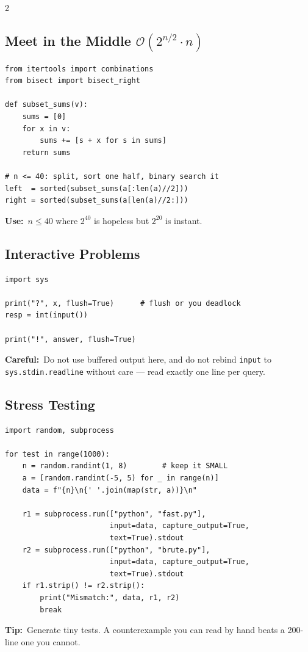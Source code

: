 \documentclass[10pt]{article}
\newcommand{\code}[1]{\texttt{\small #1}}
\newcommand{\sub}[2]{\subsection[#1]{#1\hspace{0.6em}%
  \textnormal{\color{accent2}\small$\mathcal{O}(#2)$}}}
\newcommand{\uses}[1]{{\color{accent2}\footnotesize\textbf{Use:}}~{\footnotesize #1}\par}
\newcommand{\tip}[1]{{\color{tipc}\footnotesize\textbf{Tip:}}~{\footnotesize #1}\par}
\newcommand{\warn}[1]{{\color{warnc}\footnotesize\textbf{Careful:}}~{\footnotesize #1}\par}
\begin{document}
\begin{multicols}{2}

\sub{Meet in the Middle}{2^{n/2} \cdot n}
\begin{lstlisting}
from itertools import combinations
from bisect import bisect_right

def subset_sums(v):
    sums = [0]
    for x in v:
        sums += [s + x for s in sums]
    return sums

# n <= 40: split, sort one half, binary search it
left  = sorted(subset_sums(a[:len(a)//2]))
right = sorted(subset_sums(a[len(a)//2:]))
\end{lstlisting}
\uses{$n \le 40$ where $2^{40}$ is hopeless but $2^{20}$ is instant.}

\subsection{Interactive Problems}
\begin{lstlisting}
import sys

print("?", x, flush=True)      # flush or you deadlock
resp = int(input())

print("!", answer, flush=True)
\end{lstlisting}
\warn{Do not use buffered output here, and do not rebind \code{input} to
\code{sys.stdin.readline} without care --- read exactly one line per
query.}

\subsection{Stress Testing}
\begin{lstlisting}
import random, subprocess

for test in range(1000):
    n = random.randint(1, 8)        # keep it SMALL
    a = [random.randint(-5, 5) for _ in range(n)]
    data = f"{n}\n{' '.join(map(str, a))}\n"

    r1 = subprocess.run(["python", "fast.py"],
                        input=data, capture_output=True,
                        text=True).stdout
    r2 = subprocess.run(["python", "brute.py"],
                        input=data, capture_output=True,
                        text=True).stdout
    if r1.strip() != r2.strip():
        print("Mismatch:", data, r1, r2)
        break
\end{lstlisting}
\tip{Generate tiny tests. A counterexample you can read by hand beats a
200-line one you cannot.}


\end{multicols}
\end{document}
